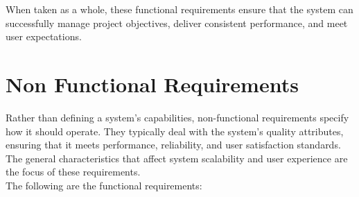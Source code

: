 When taken as a whole, these functional requirements ensure that the system can successfully manage project objectives, deliver consistent performance, and meet user expectations.

\section{Non Functional Requirements}
Rather than defining a system's capabilities, non-functional requirements specify how it should operate. They typically deal with the system's quality attributes, ensuring that it meets performance, reliability, and user satisfaction standards. The general characteristics that affect system scalability and user experience are the focus of these requirements.\\
The following are the functional requirements:\\

